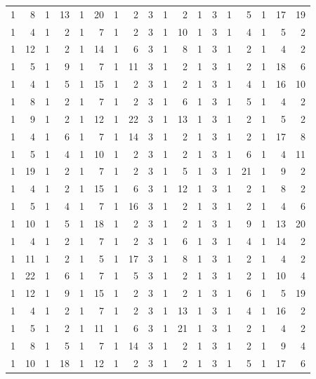 \documentclass[11pt,reqno]{amsart}
\theoremstyle{plain}
\theoremstyle{plain}
\theoremstyle{plain}
\begin{document}
\begin{center}
\begin{tabular}{rrrrrrrrrrrrrrrrrr}
 1 &  8 &  1 & 13 &  1 & 20 &  1 &  2 &  3 &  1 &  2 &  1 &  3 &  1 &  5 &  1 & 17 & 19 \\
 1 &  4 &  1 &  2 &  1 &  7 &  1 &  2 &  3 &  1 & 10 &  1 &  3 &  1 &  4 &  1 &  5 &  2 \\
 1 & 12 &  1 &  2 &  1 & 14 &  1 &  6 &  3 &  1 &  8 &  1 &  3 &  1 &  2 &  1 &  4 &  2 \\
 1 &  5 &  1 &  9 &  1 &  7 &  1 & 11 &  3 &  1 &  2 &  1 &  3 &  1 &  2 &  1 & 18 &  6 \\
 1 &  4 &  1 &  5 &  1 & 15 &  1 &  2 &  3 &  1 &  2 &  1 &  3 &  1 &  4 &  1 & 16 & 10 \\
 1 &  8 &  1 &  2 &  1 &  7 &  1 &  2 &  3 &  1 &  6 &  1 &  3 &  1 &  5 &  1 &  4 &  2 \\
 1 &  9 &  1 &  2 &  1 & 12 &  1 & 22 &  3 &  1 & 13 &  1 &  3 &  1 &  2 &  1 &  5 &  2 \\
 1 &  4 &  1 &  6 &  1 &  7 &  1 & 14 &  3 &  1 &  2 &  1 &  3 &  1 &  2 &  1 & 17 &  8 \\
 1 &  5 &  1 &  4 &  1 & 10 &  1 &  2 &  3 &  1 &  2 &  1 &  3 &  1 &  6 &  1 &  4 & 11 \\
 1 & 19 &  1 &  2 &  1 &  7 &  1 &  2 &  3 &  1 &  5 &  1 &  3 &  1 & 21 &  1 &  9 &  2 \\
 1 &  4 &  1 &  2 &  1 & 15 &  1 &  6 &  3 &  1 & 12 &  1 &  3 &  1 &  2 &  1 &  8 &  2 \\
 1 &  5 &  1 &  4 &  1 &  7 &  1 & 16 &  3 &  1 &  2 &  1 &  3 &  1 &  2 &  1 &  4 &  6 \\
 1 & 10 &  1 &  5 &  1 & 18 &  1 &  2 &  3 &  1 &  2 &  1 &  3 &  1 &  9 &  1 & 13 & 20 \\
 1 &  4 &  1 &  2 &  1 &  7 &  1 &  2 &  3 &  1 &  6 &  1 &  3 &  1 &  4 &  1 & 14 &  2 \\
 1 & 11 &  1 &  2 &  1 &  5 &  1 & 17 &  3 &  1 &  8 &  1 &  3 &  1 &  2 &  1 &  4 &  2 \\
 1 & 22 &  1 &  6 &  1 &  7 &  1 &  5 &  3 &  1 &  2 &  1 &  3 &  1 &  2 &  1 & 10 &  4 \\
 1 & 12 &  1 &  9 &  1 & 15 &  1 &  2 &  3 &  1 &  2 &  1 &  3 &  1 &  6 &  1 &  5 & 19 \\
 1 &  4 &  1 &  2 &  1 &  7 &  1 &  2 &  3 &  1 & 13 &  1 &  3 &  1 &  4 &  1 & 16 &  2 \\
 1 &  5 &  1 &  2 &  1 & 11 &  1 &  6 &  3 &  1 & 21 &  1 &  3 &  1 &  2 &  1 &  4 &  2 \\
 1 &  8 &  1 &  5 &  1 &  7 &  1 & 14 &  3 &  1 &  2 &  1 &  3 &  1 &  2 &  1 &  9 &  4 \\
 1 & 10 &  1 & 18 &  1 & 12 &  1 &  2 &  3 &  1 &  2 &  1 &  3 &  1 &  5 &  1 & 17 &  6 \\
\end{tabular}
\end{center}
\end{document}

